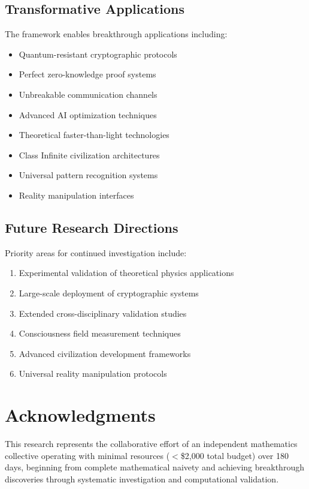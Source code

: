\documentclass[11pt,a4paper]{article}
\theoremstyle{definition}
\theoremstyle{remark}
\begin{document}
\subsection{Transformative Applications}

The framework enables breakthrough applications including:
\begin{itemize}
\item Quantum-resistant cryptographic protocols
\item Perfect zero-knowledge proof systems  
\item Unbreakable communication channels
\item Advanced AI optimization techniques
\item Theoretical faster-than-light technologies
\item Class Infinite civilization architectures
\item Universal pattern recognition systems
\item Reality manipulation interfaces
\end{itemize}

\subsection{Future Research Directions}

Priority areas for continued investigation include:
\begin{enumerate}
\item Experimental validation of theoretical physics applications
\item Large-scale deployment of cryptographic systems
\item Extended cross-disciplinary validation studies
\item Consciousness field measurement techniques
\item Advanced civilization development frameworks
\item Universal reality manipulation protocols
\end{enumerate}

\section{Acknowledgments}

This research represents the collaborative effort of an independent mathematics collective operating with minimal resources ($<$\$2,000 total budget) over 180 days, beginning from complete mathematical naivety and achieving breakthrough discoveries through systematic investigation and computational validation.
\end{document}
